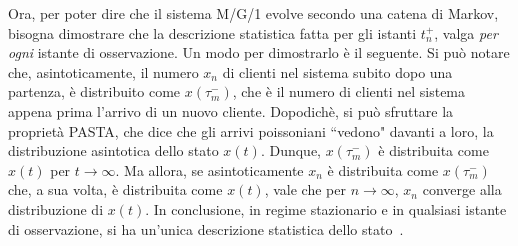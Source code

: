 Ora, per poter dire che il sistema M/G/1 evolve secondo una catena di Markov, bisogna dimostrare che la descrizione statistica fatta per gli istanti $t_n^+$, valga \textit{per ogni} istante di osservazione. 
Un modo per dimostrarlo \`e il seguente. Si può notare che, asintoticamente, il numero $x_n$ di clienti nel sistema subito dopo una partenza, \`e distribuito come $x(\tau_m^-)$, che \`e il numero di clienti nel sistema appena prima l'arrivo di un nuovo cliente. Dopodich\`e, si può sfruttare la proprietà PASTA, che dice che gli arrivi poissoniani ``vedono" davanti a loro, la distribuzione asintotica dello stato $x(t)$. Dunque, $x(\tau_m^-)$ \`e distribuita come $x(t)$ per $t \to \infty$. Ma allora, se asintoticamente $x_n$ \`e distribuita come $x(\tau_m^-)$ che, a sua volta, \`e distribuita come $x(t)$, vale che per $n \to \infty$, $x_n$ converge alla distribuzione di $x(t)$. In conclusione, in regime stazionario e in qualsiasi istante di osservazione, si ha un'unica descrizione statistica dello stato~\cite{libro:tele}.


